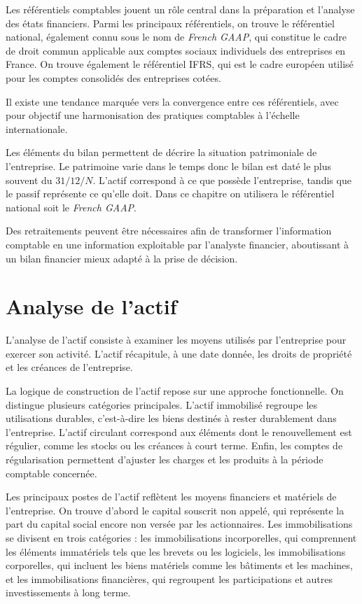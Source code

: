 \documentclass[a4paper, 12pt]{report}
\begin{document}
Les référentiels comptables jouent un rôle central dans la préparation et l'analyse des états financiers. Parmi les principaux référentiels, on trouve le référentiel national, également connu sous le nom de \textit{French GAAP}, qui constitue le cadre de droit commun applicable aux comptes sociaux individuels des entreprises en France. On trouve également le référentiel IFRS, qui est le cadre européen utilisé pour les comptes consolidés des entreprises cotées. 

Il existe une tendance marquée vers la convergence entre ces référentiels, avec pour objectif une harmonisation des pratiques comptables à l'échelle internationale. 

Les éléments du bilan permettent de décrire la situation patrimoniale de l'entreprise. Le patrimoine varie dans le temps donc le bilan est daté le plus souvent du \( 31/12/N \). L'actif correspond à ce que possède l'entreprise, tandis que le passif représente ce qu'elle doit. Dans ce chapitre on utilisera le référentiel national soit le \textit{French GAAP}.

Des retraitements peuvent être nécessaires afin de transformer l'information comptable en une information exploitable par l'analyste financier, aboutissant à un bilan financier mieux adapté à la prise de décision.

\section{Analyse de l'actif}

L'analyse de l'actif consiste à examiner les moyens utilisés par l'entreprise pour exercer son activité. L'actif récapitule, à une date donnée, les droits de propriété et les créances de l'entreprise. 

La logique de construction de l'actif repose sur une approche fonctionnelle. On distingue plusieurs catégories principales. L'actif immobilisé regroupe les utilisations durables, c'est-à-dire les biens destinés à rester durablement dans l'entreprise. L'actif circulant correspond aux éléments dont le renouvellement est régulier, comme les stocks ou les créances à court terme. Enfin, les comptes de régularisation permettent d'ajuster les charges et les produits à la période comptable concernée.

Les principaux postes de l'actif reflètent les moyens financiers et matériels de l'entreprise. On trouve d'abord le capital souscrit non appelé, qui représente la part du capital social encore non versée par les actionnaires. Les immobilisations se divisent en trois catégories : les immobilisations incorporelles, qui comprennent les éléments immatériels tels que les brevets ou les logiciels, les immobilisations corporelles, qui incluent les biens matériels comme les bâtiments et les machines, et les immobilisations financières, qui regroupent les participations et autres investissements à long terme. 
\end{document}
